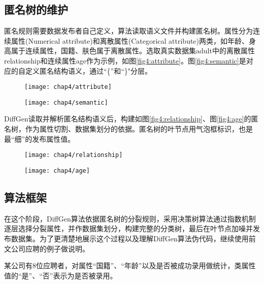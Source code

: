 \subsection{匿名树的维护}

匿名规则需要数据发布者自己定义，算法读取语义文件并构建匿名树。属性分为连续属性(Numerical attribute)和离散属性(Categorical attribute)两类，如年龄、身高属于连续属性，国籍、肤色属于离散属性。选取真实数据集adult\cite{adult}中的离散属性relationship和连续属性age作为示例，如图\ref{fig4:attribute}。图\ref{fig4:semantic}是对应的自定义匿名结构语义，通过“\{”和“\}"分层。

\begin{figure}[!htp]
	\centering
	\texttt{[image: chap4/attribute]}
\end{figure}


\begin{figure}[!htp]
	\centering
	\texttt{[image: chap4/semantic]}
\end{figure}

DiffGen读取并解析匿名结构语义后，构建如图\ref{fig4:relationship}、图\ref{fig4:age}的匿名树，作为属性切割、数据集划分的依据。匿名树的叶节点用气泡框标识，也是最“细”的发布属性值。

\begin{figure}[!htp]
	\centering
	\texttt{[image: chap4/relationship]}
\end{figure}

\begin{figure}[!htp]
	\centering
	\texttt{[image: chap4/age]}
\end{figure}

\subsection{算法框架}

在这个阶段，DiffGen算法依据匿名树的分裂规则，采用决策树算法通过指数机制逐层选择分裂属性，并作数据集划分，构建完整的分类树，最后在叶节点加噪并发布数据集。为了更清楚地展示这个过程以及理解DiffGen算法伪代码，继续使用前文公司应聘的例子做说明。
\begin{exmp}
	\label{chap4_exmp}
	某公司有8位应聘者，对属性“国籍”、“年龄”以及是否被成功录用做统计，类属性值的“是”、“否”表示为是否被录用。
\end{exmp}

